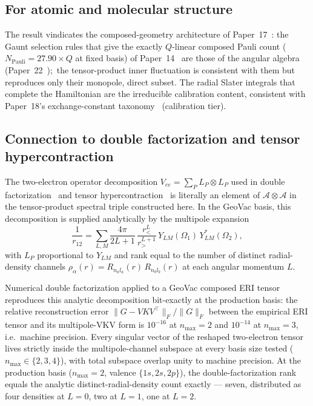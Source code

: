 \documentclass[twocolumn,pra,amsmath,amssymb,superscriptaddress]{revtex4-2}
\begin{document}
\subsection{For atomic and molecular structure}

The result vindicates the composed-geometry architecture of
Paper~17~\cite{paper17}: the Gaunt selection rules that give the
exactly $Q$-linear composed Pauli count
($N_{\mathrm{Pauli}} = 27.90 \times Q$ at fixed basis) of
Paper~14~\cite{paper14} are those of the angular algebra
(Paper~22~\cite{paper22});\ the tensor-product inner fluctuation is
consistent with them but reproduces only their monopole, direct
subset. The radial Slater integrals that complete the
Hamiltonian are the irreducible calibration content, consistent with
Paper~18's exchange-constant taxonomy~\cite{paper18} (calibration
tier).

\subsection{Connection to double factorization and tensor
hypercontraction}
\label{subsec:df_thc_connection}

The two-electron operator decomposition $V_{ee} = \sum_P L_P \otimes
L_P$ used in double factorization~\cite{vonBurg2021} and tensor
hypercontraction~\cite{Lee2021} is literally an element of
$\mathcal{A} \otimes \mathcal{A}$ in the tensor-product spectral
triple constructed here. In the GeoVac basis, this decomposition is
supplied analytically by the multipole expansion
\begin{equation*}
  \frac{1}{r_{12}} = \sum_{L,M}\frac{4\pi}{2L{+}1}\,
  \frac{r_<^L}{r_>^{L{+}1}}\,Y_{LM}(\Omega_1)\,Y_{LM}^{*}(\Omega_2),
\end{equation*}
with $L_P$ proportional to $Y_{LM}$ and rank equal to the number of
distinct radial-density channels $\rho_\alpha(r) = R_{n_a l_a}(r)\,
R_{n_b l_b}(r)$ at each angular momentum $L$.

Numerical double factorization applied to a GeoVac composed ERI
tensor reproduces this analytic decomposition bit-exactly at the
production basis: the relative reconstruction error
$\|G - V K V^\top\|_F / \|G\|_F$ between the empirical ERI tensor and
its multipole-VKV form is $10^{-16}$ at $n_{\max} = 2$ and $10^{-14}$
at $n_{\max} = 3$, i.e.\ machine precision. Every singular vector of
the reshaped two-electron tensor lives strictly inside the
multipole-channel subspace at every basis size tested
($n_{\max} \in \{2, 3, 4\}$), with total subspace overlap unity to
machine precision. At the production basis ($n_{\max} = 2$, valence
$\{1s, 2s, 2p\}$), the double-factorization rank equals the analytic
distinct-radial-density count exactly --- seven, distributed as four
densities at $L = 0$, two at $L = 1$, one at $L = 2$.
\end{document}

